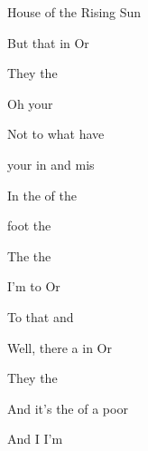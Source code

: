\begin{SBSong}{House of the Rising Sun}
\begin{SBVerse}
    But  that  in  Or
    
    They  the  
  \end{SBVerse}
  \begin{SBVerse}
    Oh   your  
    
    Not to  what  have  
    
     your  in  and mis
    
    In the  of the   
  \end{SBVerse}
  \CBPageBrk
  \begin{SBVerse}
     foot  the  
    
    The   the  
    
    I'm   to  Or
    
    To  that  and  
  \end{SBVerse}
  \begin{SBVerse}
    Well, there  a  in  Or

    They  the   

    And it's  the  of  a poor 

    And  I  I'm 
  \end{SBVerse}  
\end{SBSong}
